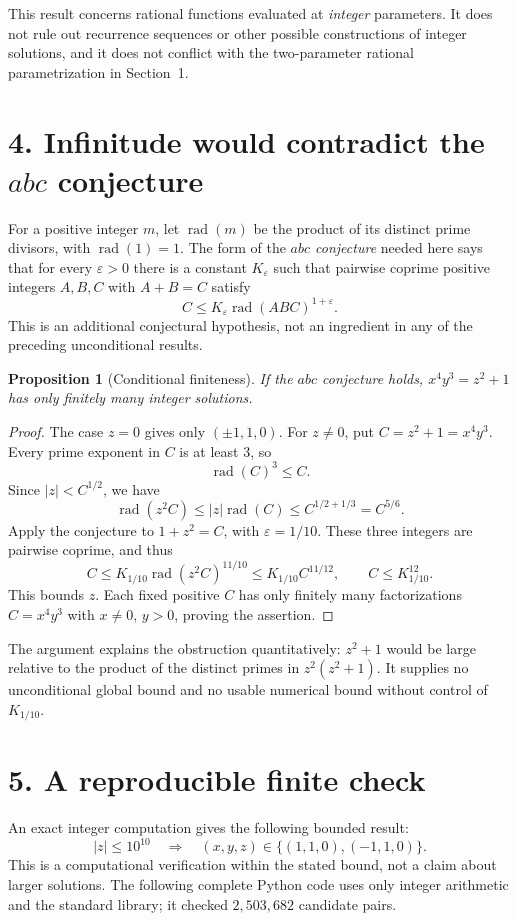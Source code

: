 \documentclass[11pt,a4paper]{article}
\newtheorem{proposition}{Proposition}
\DeclareMathOperator{\rad}{rad}
\begin{document}
This result concerns rational functions evaluated at \emph{integer} parameters.
It does not rule out recurrence sequences or other possible constructions of
integer solutions, and it does not conflict with the two-parameter rational
parametrization in Section~1.

\section*{4. Infinitude would contradict the $abc$ conjecture}
For a positive integer $m$, let $\rad(m)$ be the product of its distinct prime
divisors, with $\rad(1)=1$. The form of the \emph{$abc$ conjecture} needed here
says that for every $\varepsilon>0$ there is a constant $K_\varepsilon$ such that
pairwise coprime positive integers $A,B,C$ with $A+B=C$ satisfy
\[
 C\le K_\varepsilon\rad(ABC)^{1+\varepsilon}.
\]
This is an additional conjectural hypothesis, not an ingredient in any of the
preceding unconditional results.

\begin{proposition}[Conditional finiteness]
If the $abc$ conjecture holds, $x^4y^3=z^2+1$ has only finitely many integer
solutions.
\end{proposition}
\begin{proof}
The case $z=0$ gives only $(\pm1,1,0)$. For $z\ne0$, put
$C=z^2+1=x^4y^3$. Every prime exponent in $C$ is at least $3$, so
\[
 \rad(C)^3\le C.
\]
Since $|z|<C^{1/2}$, we have
\[
 \rad(z^2C)\le |z|\rad(C)\le C^{1/2+1/3}=C^{5/6}.
\]
Apply the conjecture to $1+z^2=C$, with $\varepsilon=1/10$. These three
integers are pairwise coprime, and thus
\[
 C\le K_{1/10}\rad(z^2C)^{11/10}
   \le K_{1/10}C^{11/12},
 \qquad C\le K_{1/10}^{12}.
\]
This bounds $z$. Each fixed positive $C$ has only finitely many factorizations
$C=x^4y^3$ with $x\ne0$, $y>0$, proving the assertion.
\end{proof}

The argument explains the obstruction quantitatively: $z^2+1$ would be large
relative to the product of the distinct primes in $z^2(z^2+1)$. It supplies no
unconditional global bound and no usable numerical bound without control of
$K_{1/10}$.

\newpage
\section*{5. A reproducible finite check}
An exact integer computation gives the following bounded result:
\[
 \boxed{\ |z|\le10^{10}\quad\Longrightarrow\quad
 (x,y,z)\in\{(1,1,0),(-1,1,0)\}.\ }
\]
This is a computational verification within the stated bound, not a claim
about larger solutions. The following complete Python code uses only integer
arithmetic and the standard library; it checked $2{,}503{,}682$ candidate pairs.
\end{document}
